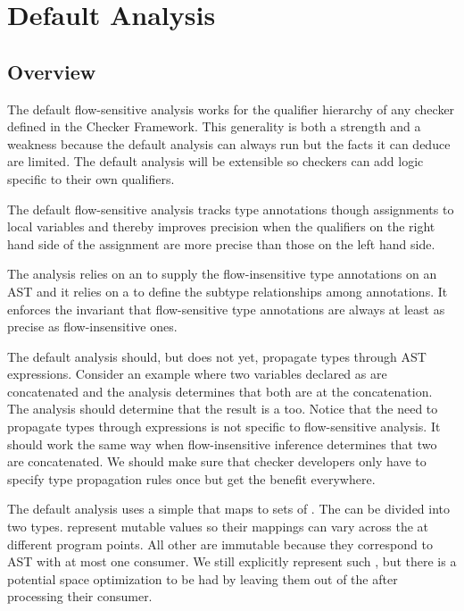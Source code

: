 \section{Default Analysis}

\subsection{Overview}

The default flow-sensitive analysis works for the qualifier hierarchy of any checker defined in 
the Checker Framework.  This generality is both a strength and a weakness because the 
default analysis can
always run but the facts it can deduce are limited.  The default analysis
will be extensible so checkers can add logic specific to their own qualifiers.

The default flow-sensitive analysis tracks type annotations though assignments to local 
variables and thereby improves precision when the qualifiers on the right hand side of the
assignment are more precise than those on the left hand side.

The analysis relies on an  to supply the flow-insensitive type 
annotations on an AST  and it relies on a  to define the 
subtype relationships 
among annotations.  It enforces the invariant that flow-sensitive type annotations are always at 
least as precise as flow-insensitive ones.

\begin{workinprogress}
The default analysis should, but does not yet, propagate types through AST expressions. 
Consider an example where two variables declared as  are concatenated and the
analysis determines that both are  at the concatenation.  The analysis 
should determine that the result is a  too.  Notice that the need to propagate
types through expressions is not specific to flow-sensitive analysis.  It should work the same way 
when flow-insensitive inference determines that two  are 
concatenated.  We should make sure that checker developers only have to specify
type propagation rules once but get the benefit everywhere.
\end{workinprogress}

The default analysis uses a simple  that maps  to sets of 
. 
The  can be divided into two types.   
represent mutable 
values so their mappings can vary across the  at different program points.  All other 
 are immutable because they correspond to AST  with at most 
one consumer. 
We still explicitly represent such , but there is a potential space optimization to be
had by leaving them out of the  after processing their consumer.


